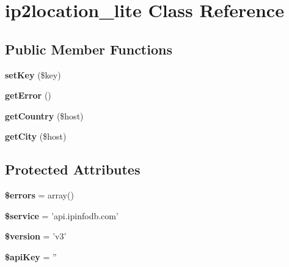 \hypertarget{classip2location__lite}{\section{ip2location\-\_\-lite Class Reference}
\label{classip2location__lite}
}
\subsection*{Public Member Functions}
\begin{DoxyCompactItemize}
\item 
\hypertarget{classip2location__lite_a9afc10d017d5c65d3e6a941f65cf1904}{{\bfseries set\-Key} (\$key)}\label{classip2location__lite_a9afc10d017d5c65d3e6a941f65cf1904}

\item 
\hypertarget{classip2location__lite_a24ada5decce3d1b79cd82f5a90ccf404}{{\bfseries get\-Error} ()}\label{classip2location__lite_a24ada5decce3d1b79cd82f5a90ccf404}

\item 
\hypertarget{classip2location__lite_a86702f3120724183d03df96ae1a2b550}{{\bfseries get\-Country} (\$host)}\label{classip2location__lite_a86702f3120724183d03df96ae1a2b550}

\item 
\hypertarget{classip2location__lite_a40dd0f01cd5cbdb134eeb86021375ed7}{{\bfseries get\-City} (\$host)}\label{classip2location__lite_a40dd0f01cd5cbdb134eeb86021375ed7}

\end{DoxyCompactItemize}
\subsection*{Protected Attributes}
\begin{DoxyCompactItemize}
\item 
\hypertarget{classip2location__lite_ab24faf4aa647cdcee494fc48524ad4ff}{{\bfseries \$errors} = array()}\label{classip2location__lite_ab24faf4aa647cdcee494fc48524ad4ff}

\item 
\hypertarget{classip2location__lite_abb8d1943d2cf9b6a3d54a4fed1ad2d9d}{{\bfseries \$service} = 'api.\-ipinfodb.\-com'}\label{classip2location__lite_abb8d1943d2cf9b6a3d54a4fed1ad2d9d}

\item 
\hypertarget{classip2location__lite_a17c8948c68aa44fa9961ae169b6a8961}{{\bfseries \$version} = 'v3'}\label{classip2location__lite_a17c8948c68aa44fa9961ae169b6a8961}

\item 
\hypertarget{classip2location__lite_a084e3db37d1b117a3cc7212cf2eed533}{{\bfseries \$api\-Key} = ''}\label{classip2location__lite_a084e3db37d1b117a3cc7212cf2eed533}

\end{DoxyCompactItemize}


